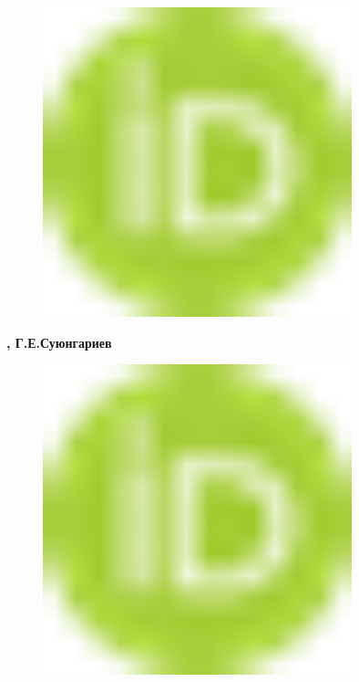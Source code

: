 \begin{figure}[H]
	\centering
	\includegraphics[width=0.8\textwidth]{media/gorn/image1}
	\caption*{}
\end{figure}
{\bfseries ,
Г.Е.Суюнгариев}
\begin{figure}[H]
	\centering
	\includegraphics[width=0.8\textwidth]{media/gorn/image1}
	\caption*{}
\end{figure}

